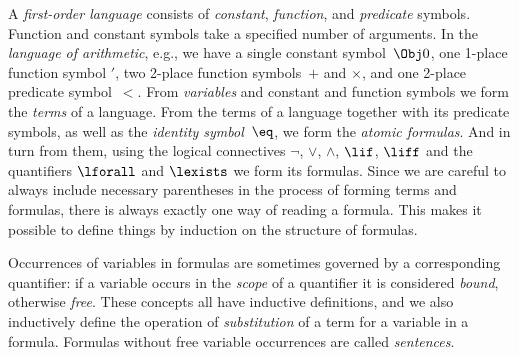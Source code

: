 A \emph{first-order language} consists of \emph{constant},
\emph{function}, and \emph{predicate} symbols. Function and constant
symbols take a specified number of arguments. In the \emph{language of
arithmetic}, e.g., we have a single constant symbol~$\Obj 0$, one
1-place function symbol $\prime$, two 2-place function symbols~$+$ and
$\times$, and one 2-place predicate symbol~$<$. From \emph{variables}
and constant and function symbols we form the \emph{terms} of a
language. From the terms of a language together with its predicate
symbols, as well as the \emph{identity symbol}~$\eq$, we form the
\emph{atomic formulas}. And in turn from them, using the logical
connectives $\lnot$, $\lor$, $\land$, $\lif$, $\liff$ and the
quantifiers $\lforall$ and $\lexists$ we form its formulas. Since we
are careful to always include necessary parentheses in the process of
forming terms and formulas, there is always exactly one way of reading
a formula. This makes it possible to define things by induction on the
structure of formulas.

Occurrences of variables in formulas are sometimes governed by a
corresponding quantifier: if a variable occurs in the \emph{scope} of
a quantifier it is considered \emph{bound}, otherwise
\emph{free}. These concepts all have inductive definitions, and we
also inductively define the operation of \emph{substitution} of a term
for a variable in a formula. Formulas without free variable
occurrences are called \emph{sentences}.
